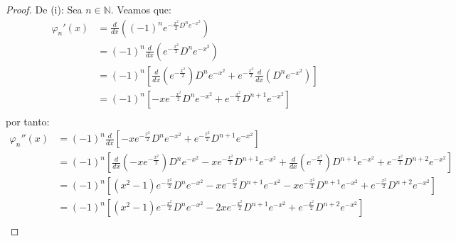 \documentclass[12pt]{report}
\theoremstyle{largebreak}
\begin{document}
    \begin{proof}
        De (i): Sea $n\in\mathbb{N}$. Veamos que:
        \begin{equation*}
            \begin{split}
                \varphi_n'(x)
                &=\frac{d}{dx}\left((-1)^ne^{-\frac{x^2}{2}D^ne^{-x^2}} \right)\\
                &=(-1)^n\frac{d}{dx}\left(e^{-\frac{x^2}{2}}D^n e^{-x^2}\right)\\
                &=(-1)^n\left[\frac{d}{dx}\left(e^{-\frac{x^2}{2}}\right)D^n e^{-x^2}+e^{-\frac{x^2}{2}}\frac{d}{dx}\left(D^n e^{-x^2}\right)\right] \\
                &=(-1)^n\left[-xe^{-\frac{x^2}{2}}D^n e^{-x^2}+e^{-\frac{x^2}{2}}D^{n+1 } e^{-x^2}\right] \\
            \end{split}
        \end{equation*}
        por tanto:
        \begin{equation*}
            \begin{split}
                \varphi_n''(x)
                &=(-1)^n\frac{d}{dx}\left[-xe^{-\frac{x^2}{2}}D^n e^{-x^2}+e^{-\frac{x^2}{2}}D^{n+1 } e^{-x^2}\right] \\
                &=(-1)^n\left[\frac{d}{dx}(-xe^{-\frac{x^2}{2}})D^n e^{-x^2}-xe^{-\frac{x^2}{2}}D^{n+1}e^{-x^2}+\frac{d}{dx}(e^{-\frac{x^2}{2}})D^{n+1 } e^{-x^2}+e^{-\frac{x^2}{2}}D^{n+2 } e^{-x^2}\right] \\
                &=(-1)^n\left[(x^2-1)e^{-\frac{x^2}{2}}D^n e^{-x^2}-xe^{-\frac{x^2}{2}}D^{n+1}e^{-x^2}-xe^{-\frac{x^2}{2}}D^{n+1 } e^{-x^2}+e^{-\frac{x^2}{2}}D^{n+2 } e^{-x^2}\right] \\
                &=(-1)^n\left[(x^2-1)e^{-\frac{x^2}{2}}D^n e^{-x^2}-2xe^{-\frac{x^2}{2}}D^{n+1}e^{-x^2}+e^{-\frac{x^2}{2}}D^{n+2 } e^{-x^2}\right] \\
            \end{split}
        \end{equation*}
    \end{proof}
\end{document}
